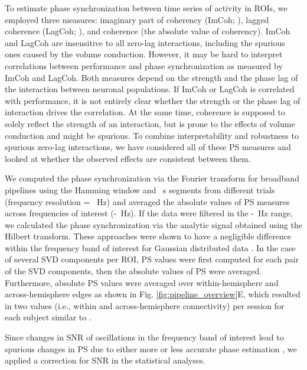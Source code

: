 To estimate phase synchronization between time series of activity in ROIs, we employed three measures: imaginary part of coherency (ImCoh; \cite{Nolte2004}), lagged coherence (LagCoh; \cite{PascualMarqui2011}), and coherence (the absolute value of coherency). ImCoh and LagCoh are insensitive to all zero-lag interactions, including the spurious ones caused by the volume conduction. However, it may be hard to interpret correlations between performance and phase synchronization as measured by ImCoh and LagCoh. Both measures depend on the strength and the phase lag of the interaction between neuronal populations. If ImCoh or LagCoh is correlated with performance, it is not entirely clear whether the strength or the phase lag of interaction drives the correlation. At the same time, coherence is supposed to solely reflect the strength of an interaction, but is prone to the effects of volume conduction and might be spurious. To combine interpretability and robustness to spurious zero-lag interactions, we have considered all of these PS measures and looked at whether the observed effects are consistent between them.

\medskip

We computed the phase synchronization via the Fourier transform for broadband pipelines using the Hamming window and \fftSegLength~s segments from different trials (frequency resolution = \fftFreqRes~Hz) and averaged the absolute values of PS measures across frequencies of interest (\muLow-\muHigh~Hz). If the data were filtered in the \muLow-\muHigh~Hz range, we calculated the phase synchronization via the analytic signal obtained using the Hilbert transform. These approaches were shown to have a negligible difference within the frequency band of interest for Gaussian distributed data \citep{Nolte2020}. In the case of several SVD components per ROI, PS values were first computed for each pair of the SVD components, then the absolute values of PS were averaged. Furthermore, absolute PS values were averaged over within-hemisphere and across-hemisphere edges as shown in Fig. \ref{fig:pipeline_overview}E, which resulted in two values (i.e., within and across-hemisphere connectivity) per session for each subject similar to \citep{Vidaurre2020}.

\medskip

Since changes in SNR of oscillations in the frequency band of interest lead to spurious changes in PS due to either more or less accurate phase estimation \citep{MuthukumaraswamySingh2011}, we applied a correction for SNR in the statistical analyses.

